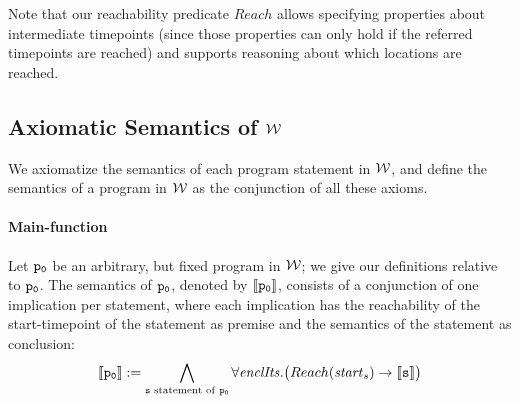 Note that our reachability predicate $\mathit{Reach}$ allows specifying
properties about intermediate timepoints
(since those properties can only hold if the referred timepoints are
reached) and supports reasoning about which locations are reached.


\subsection{Axiomatic Semantics of $\mathcal{W}$}
We axiomatize the semantics of each program statement in $\mathcal{W}$,
and define the semantics of a program  in $\mathcal{W}$ as the conjunction of all these axioms.

\paragraph{Main-function}
Let $\texttt{p$\mathtt{_{0}}$}$ be an arbitrary, but fixed program in
$\mathcal{W}$; we give our
definitions relative to $\texttt{p$\mathtt{_{0}}$}$. %
The semantics of $\texttt{p$\mathtt{_{0}}$}$, denoted by $\llbracket \texttt{p$\mathtt{_{0}}$}
\rrbracket$,  consists of a conjunction of one implication per statement, where each implication has the reachability of the start-timepoint of the statement as premise and the semantics of the statement as conclusion:
$$\llbracket \texttt{p$\mathtt{_{0}}$} \rrbracket := \bigwedge_{\texttt{s} \text{ statement of \texttt{p$\mathtt{_{0}}$}}}  \forall \mathit{enclIts}. \big(Reach(\mathit{start}_s) \rightarrow \llbracket \texttt{s} \rrbracket\big)$$

